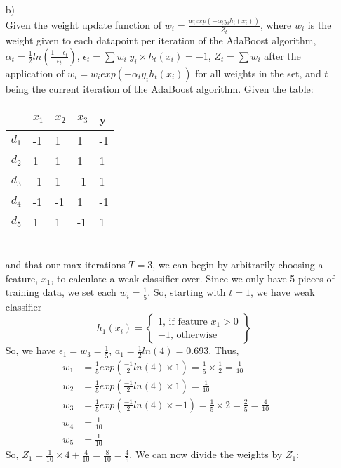 \documentclass[12pt]{article} %
\begin{document}
\begin{flushleft}
\begin{enumerate}
	\item[b)]\ \\
		Given the weight update function of $w_i = \frac{w_iexp(-\alpha_ty_ih_t(x_i))}{Z_t}$, where $w_i$ is the weight given to each datapoint per iteration of the AdaBoost algorithm, $\alpha_t = \frac{1}{2}ln(\frac{1-\epsilon_t}{\epsilon_t})$, $\epsilon_t = \sum w_i |y_i\times h_t(x_i) = -1$, $Z_t = \sum w_i$ after the application of $w_i = w_iexp(-\alpha_ty_ih_t(x_i))$ for all weights in the set, and $t$ being the current iteration of the AdaBoost algorithm. Given the table:\\
\begin{center}
\begin{tabular}{|p{1.2cm} | p{1.2cm} p{1.2cm} p{1.2cm}|p{1.2cm}|}
		\hline
		\ & $x_1$ & $x_2$ & $x_3$ & y \\
		\hline
		$d_1$ & -1 & 1 & 1 & -1 \\
		$d_2$ & 1 & 1 & 1 & 1 \\
		$d_3$ & -1 & 1 & -1 & 1 \\
		$d_4$ & -1 & -1 & 1 & -1 \\
		$d_5$ & 1 & 1 & -1 & 1 \\
		\hline
\end{tabular}
\end{center}\ \\
and that our max iterations $T = 3$, we can begin by arbitrarily choosing a feature, $x_1$, to calculate a weak classifier over. Since we only have 5 pieces of training data, we set each $w_i = \frac{1}{5}$. So, starting with $t = 1$, we have weak classifier
\[h_1(x_i) = \left\{\begin{array}{lc}
1 \text{, if feature $x_1 > 0$} \\
-1 \text{, otherwise}
\end{array}\right\}\]
So, we have $\epsilon_1 = w_3 = \frac{1}{5}$, $a_1 = \frac{1}{2} ln(4) = 0.693$. Thus,
\begin{align*}
	w_1 &= \frac{1}{5}exp(\frac{-1}{2}ln(4)\times1) = \frac{1}{5}\times\frac{1}{2} = \frac{1}{10}&&\\
	w_2 &= \frac{1}{5}exp(\frac{-1}{2}ln(4)\times1) = \frac{1}{10} &&\\
	w_3 &= \frac{1}{5}exp(\frac{-1}{2}ln(4)\times-1) = \frac{1}{5}\times2 = \frac{2}{5} = \frac{4}{10} &&\\
	w_4 &= \frac{1}{10} &&\\
	w_5 &= \frac{1}{10}
\end{align*}
So, $Z_1 = \frac{1}{10} \times 4 + \frac{4}{10} = \frac{8}{10} = \frac{4}{5}$. We can now divide the weights by $Z_1$:

\end{enumerate}
\end{flushleft}
\end{document}
